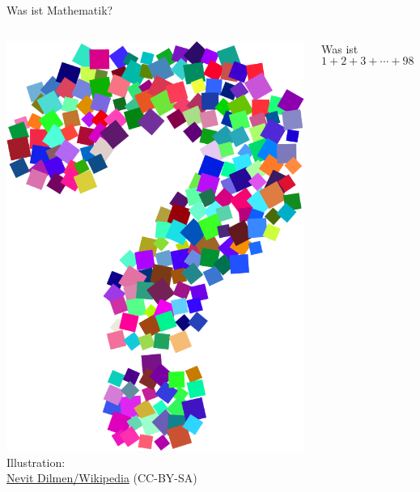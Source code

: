 \documentclass[12pt,compress,ngerman,utf8,t]{beamer}
\newcommand{\withsource}[2]{\begin{center}#1\\\tiny #2\end{center}}
\begin{document}
\begin{frame}{Was ist Mathematik?}
  \vspace*{-1em}
  \begin{columns}[c]
    \begin{column}{0.2\textwidth}
      \withsource{
        \includegraphics[width=\textwidth]{question-mark}
      }{
        Illustration: \\
        \href{https://commons.wikimedia.org/wiki/File:Question_mark_1.svg}{Nevit
        Dilmen/Wikipedia} (CC-BY-SA)
      }
    \end{column}

    \begin{column}{0.7\textwidth}
      \large\centering
      Was ist{\quad}
      \[ 1 + 2 + 3 + \cdots + 98 + 99 + 100? \]
    \end{column}
  \end{columns}


\end{frame}
\end{document}

